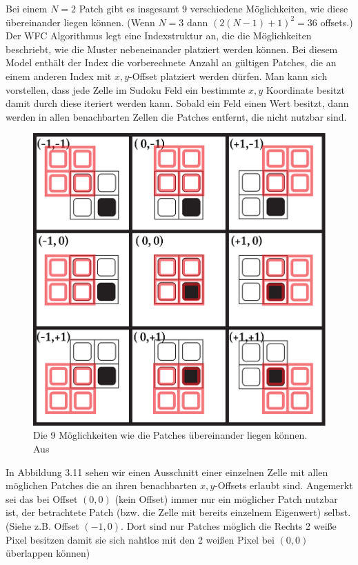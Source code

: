 \documentclass[12pt, a4paper,twoside,openright]{report} %
\begin{document}
Bei einem $N = 2$ Patch gibt es insgesamt 9 verschiedene Möglichkeiten, wie diese übereinander liegen können.
{(Wenn $N = 3$ dann $(2(N - 1) + 1)^2 = 36$ offsets.)}
Der WFC Algorithmus legt eine Indexstruktur an, die die Möglichkeiten beschriebt, wie die Muster nebeneinander platziert werden können.
Bei diesem Model enthält der Index die vorberechnete Anzahl an gültigen Patches, die an einem anderen Index mit $x,y$-Offset platziert werden dürfen. 
Man kann sich vorstellen, dass jede Zelle im Sudoku Feld ein bestimmte $x,y$ Koordinate besitzt damit durch diese iteriert werden kann.
Sobald ein Feld einen Wert besitzt, dann werden in allen benachbarten Zellen die Patches entfernt, die nicht nutzbar sind. \cite{Karth2017WaveFunctionCollapseIC}

\begin{figure}[H]
    \centering
    \includegraphics[width=0.5\linewidth]{images/red-maze-offset.png}%
    \caption{Die 9 Möglichkeiten wie die Patches übereinander liegen können. Aus \cite{Karth2017WaveFunctionCollapseIC}}%
\end{figure}

In Abbildung 3.11 sehen wir einen Ausschnitt einer einzelnen Zelle mit allen möglichen Patches die an ihren benachbarten $x,y$-Offsets erlaubt sind.
Angemerkt sei das bei Offset $(0,0)$ {(kein Offset)} immer nur ein möglicher Patch nutzbar ist, der betrachtete Patch {(bzw. die Zelle mit bereits einzelnem Eigenwert)} selbst.
{(Siehe z.B. Offset $(-1,0)$. Dort sind nur Patches möglich die Rechts 2 weiße Pixel besitzen damit sie sich nahtlos mit den 2 weißen Pixel bei $(0,0)$ überlappen können)} \cite{Karth2017WaveFunctionCollapseIC}
\end{document}
